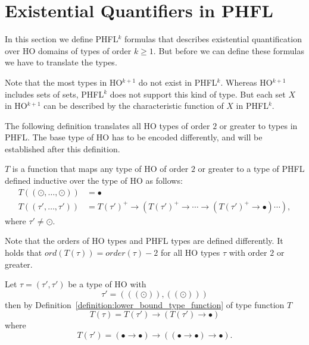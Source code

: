 

\section{Existential Quantifiers in PHFL}\label{sec:existential_quantifiers_in_phfl}

In this section we define PHFL$^{k}$ formulas that describes existential quantification over HO domains of types of
order $k \geq 1$. But before we can define these formulas we have to translate the types.


Note that the most types in HO$^{k + 1}$ do not exist in PHFL$^k$. Whereas HO$^{k +
1}$ includes sets of sets, PHFL$^k$ does not support this kind of type.
But each set $X$ in HO$^{k+1}$ can be described by the characteristic function of $X$ in PHFL$^k$.

The following definition translates all HO types of order $2$ or greater to types in PHFL. The base type of HO
has to be encoded differently, and will be established after this definition.

\begin{definition}
    \label{definition:lower_bound_type_function}
    $T$ is a function that maps any type of HO of order $2$ or greater to a type of PHFL defined inductive over the
    type of HO as follows:
    \begin{align*}
        T((\odot, \dots, \odot)) &= \bullet\\
        T((\tau', \dots, \tau')) &= T(\tau')^+ \rightarrow (T(\tau')^+ \rightarrow \dotsb \rightarrow (T(\tau')^+
        \rightarrow \bullet) \dotsb ),
    \end{align*}
    where $\tau' \neq \odot$.
\end{definition}

Note that the orders of HO types and PHFL types are defined differently. It holds that $ord(T(\tau)) = order(\tau) - 2$
for all HO types $\tau$ with order $2$ or greater.

\begin{example}
    Let $\tau = (\tau', \tau')$ be a type of HO with
    \[\tau' = (((\odot)), ((\odot)))\]
    then by Definition~\ref{definition:lower_bound_type_function} of type function $T$
    \[T(\tau) = T(\tau') \rightarrow (T(\tau') \rightarrow \bullet)\]
    where
    \[T(\tau') = (\bullet \rightarrow \bullet) \rightarrow ((\bullet \rightarrow \bullet) \rightarrow \bullet).\]
\end{example}

